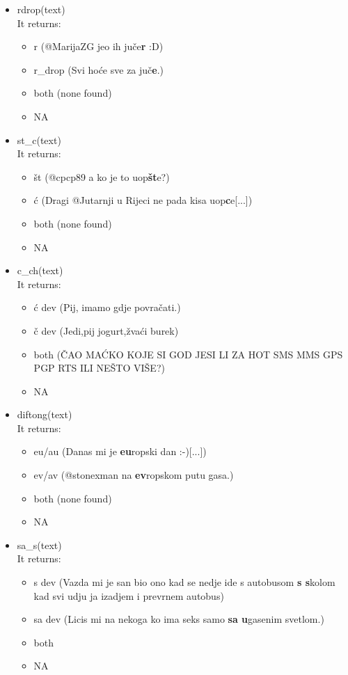 \documentclass[a4paper]{article}
\begin{document}
\begin{itemize}
\item rdrop(text)\\
It returns:
\begin{itemize}
\item r (@MarijaZG jeo ih juče\textbf{r} :D)
\item r\_drop (Svi hoće sve za juč\textbf{e}.)
\item both (none found)
\item NA
\end{itemize}

\item st\_c(text)\\
It returns:
\begin{itemize}
\item št (@cpcp89 a ko je to uop\textbf{št}e?)
\item ć (Dragi @Jutarnji u Rijeci ne pada kisa uop\textbf{c}e[...])
\item both (none found)
\item NA 
\end{itemize}


\item c\_ch(text)\\
It returns:
\begin{itemize}
\item ć dev (Pij, imamo gdje povračati.)
\item č dev (Jedi,pij jogurt,žvaći burek) %
\item both (ČAO MAĆKO KOJE SI GOD JESI LI ZA HOT SMS MMS GPS PGP RTS ILI NEŠTO VIŠE?)
\item NA
\end{itemize}

\item diftong(text)\\
It returns:
\begin{itemize}
\item eu/au (Danas mi je \textbf{eu}ropski dan :-)[...])
\item ev/av (@stonexman na \textbf{ev}ropskom putu gasa.)
\item both (none found)
\item NA
\end{itemize}

\item sa\_s(text)\\
It returns:
\begin{itemize}
\item s dev (Vazda mi je san bio ono kad se nedje ide s autobusom\textbf{ s s}kolom kad svi udju ja izadjem i prevrnem autobus)%
\item sa dev (Licis mi na nekoga ko ima seks samo \textbf{sa u}gasenim svetlom.)%
\item both
\item NA
\end{itemize}



\end{itemize}
\end{document}
